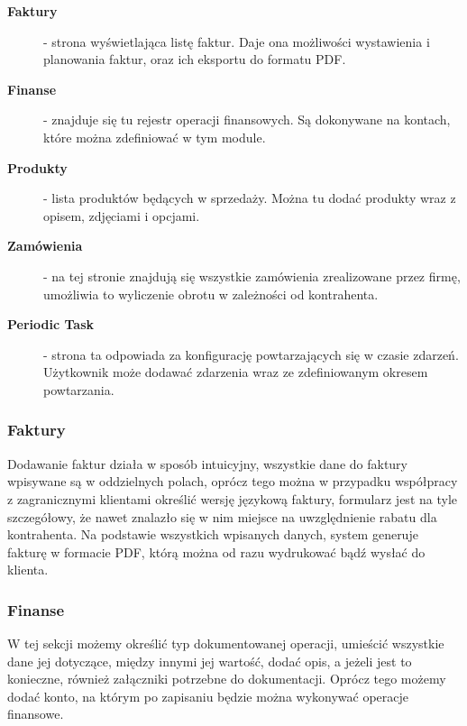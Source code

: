 \begin{description}
			\item[\textbf{Faktury}] - strona wyświetlająca listę faktur. Daje ona możliwości wystawienia i planowania faktur, oraz ich eksportu do formatu PDF.

			\item[\textbf{Finanse}] - znajduje się tu rejestr operacji finansowych. Są dokonywane na kontach, które można zdefiniować w tym module.

			\item[\textbf{Produkty}] - lista produktów będących w sprzedaży. Można tu dodać produkty wraz z opisem, zdjęciami i opcjami.

			\item[\textbf{Zamówienia}] - na tej stronie znajdują się wszystkie zamówienia zrealizowane przez firmę, umożliwia to wyliczenie obrotu w zależności od kontrahenta.

			\item[\textbf{Periodic Task}] - strona ta odpowiada za konfigurację powtarzających się w czasie zdarzeń. Użytkownik może dodawać zdarzenia wraz ze zdefiniowanym okresem powtarzania. 

		\end{description}
				 
		\subsubsection{Faktury}
			\par Dodawanie faktur działa w sposób intuicyjny, wszystkie dane do faktury wpisywane są w oddzielnych polach, oprócz tego można w przypadku współpracy z zagranicznymi klientami określić wersję językową faktury, formularz jest na tyle szczegółowy, że nawet znalazło się w nim miejsce na uwzględnienie rabatu dla kontrahenta. Na podstawie wszystkich wpisanych danych, system generuje fakturę w formacie PDF, którą można od razu wydrukować bądź wysłać do klienta.
					
		\subsubsection{Finanse}
			\par W tej sekcji możemy określić typ dokumentowanej operacji, umieścić wszystkie dane jej dotyczące, między innymi jej wartość, dodać opis, a jeżeli jest to konieczne, również załączniki potrzebne do dokumentacji. Oprócz tego możemy dodać konto, na którym po zapisaniu będzie można wykonywać operacje finansowe.
					

